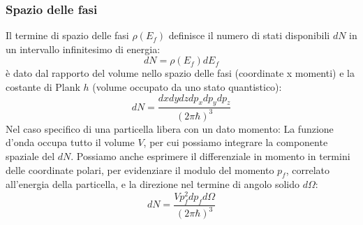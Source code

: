 \subsubsection{Spazio delle fasi}
Il termine di spazio delle fasi $\rho(E_f)$ definisce il numero di stati disponibili $dN$ in un intervallo infinitesimo di energia:
\begin{equation*}
    dN=\rho(E_f)dE_f
\end{equation*}
è dato dal rapporto del volume nello spazio delle fasi (coordinate x momenti) e la costante di Plank $h$ (volume occupato da uno stato quantistico):
\begin{equation*}
    dN=\frac{dxdydzdp_xdp_ydp_z}{(2\pi\hbar)^3}
\end{equation*}
Nel caso specifico di una particella libera con un dato momento: La funzione d'onda occupa tutto il volume $V$, per cui possiamo integrare la componente spaziale del $dN$. Possiamo anche esprimere il differenziale in momento in termini delle coordinate polari, per evidenziare il modulo del momento $p_f$, correlato all'energia della particella, e la direzione nel termine di angolo solido $d\Omega$:
\begin{equation*}
    dN=\frac{Vp^2_fdp_fd\Omega}{(2\pi\hbar)^3}
\end{equation*}
